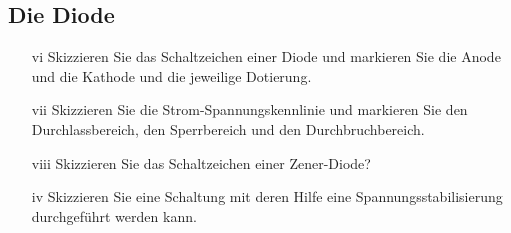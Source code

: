 \subsection*{Die Diode}

\begin{enumerate}
\itemsep1pt\parskip0pt
\item[vi] Skizzieren Sie das Schaltzeichen einer Diode und markieren Sie die Anode und die Kathode und die jeweilige Dotierung.
\item[vii] Skizzieren Sie die Strom-Spannungskennlinie und markieren Sie den Durchlassbereich, den Sperrbereich und den Durchbruchbereich.
\item[viii] Skizzieren Sie das Schaltzeichen einer Zener-Diode?
\item[iv] Skizzieren Sie eine Schaltung mit deren Hilfe eine Spannungsstabilisierung durchgeführt werden kann.
\end{enumerate}

